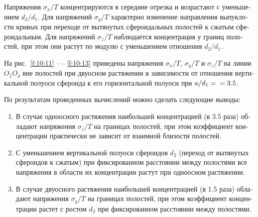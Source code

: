 \begin{russian}
Напряжения $\sigma_x/T$ концентрируются в середине отрезка и возрастают с уменьшением $d_2/d_1$. Для напряжений $\sigma_y/T$ характерно изменение направления выпуклости кривых при переходе от вытянутых сфероидальных полостей к сжатым сфероидальным. Для напряжений $\sigma_z/T$ наблюдается концентрация у границ полостей, при этом они растут по модулю с уменьшением отношения $d_2/d_1$.

На рис.~\ref{f:10:11}~--- \ref{f:10:13} приведены напряжения $\sigma_x/T$, $\sigma_y/T$ и $\sigma_z/T$ на линии $O_1O_4$ вне полостей при двуосном растяжении в зависимости от отношения вертикальной полуоси сфероида к его горизонтальной полуоси при $a/d_1=\\=3.5$.

По результатам проведенных вычислений можно сделать следующие выводы:
\begin{enumerate}
\item В случае одноосного растяжения наибольшей концентрацией (в 3.5 раза) обладают напряжения $\sigma_z/T$ на границах полостей, при этом коэффициент концентрации практически не зависит от взаимной близости полостей.
\item С уменьшением вертикальной полуоси сфероидов $d_2$ (переход от вытянутых сфероидов к сжатым) при фиксированном расстоянии между полостями все напряжения в области их концентрации растут при одноосном растяжении.
\item В случае двуосного растяжения наибольшей концентрацией (в 1.5 раза) обладают напряжения $\sigma_y/T$ на границах полостей, при этом коэффициент концентрации растет с ростом $d_2$ при фиксированном расстоянии между полостями.
\end{enumerate}


\end{russian}
